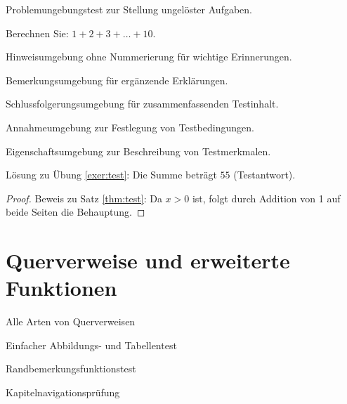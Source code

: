 \documentclass[de]{../../elegantbook}
\begin{document}
\begin{definition}[Testdefinition]
\begin{theorem}[Testsatz]
\begin{lemma}[Testlemma]
\begin{corollary}[Testkorollar]
\begin{axiom}[Testaxiom]
\begin{postulate}[Testpostulat]
\begin{proposition}[Testproposition]
\begin{problem}\label{probl:test}
Problemungebungstest zur Stellung ungelöster Aufgaben.
\end{problem}

\begin{exercise}\label{exer:test}
Berechnen Sie: $1+2+3+\dots+10$.
\end{exercise}

\begin{note}
Hinweisumgebung ohne Nummerierung für wichtige Erinnerungen.
\end{note}

\begin{remark}
Bemerkungsumgebung für ergänzende Erklärungen.
\end{remark}

\begin{conclusion}
Schlussfolgerungsumgebung für zusammenfassenden Testinhalt.
\end{conclusion}

\begin{assumption}
Annahmeumgebung zur Festlegung von Testbedingungen.
\end{assumption}

\begin{property}
Eigenschaftsumgebung zur Beschreibung von Testmerkmalen.
\end{property}

\begin{solution}
Lösung zu Übung \ref{exer:test}: Die Summe beträgt $55$ (Testantwort).
\end{solution}

\begin{proof}
Beweis zu Satz \ref{thm:test}: Da $x>0$ ist, folgt durch Addition von 1 auf beide Seiten die Behauptung.
\end{proof}

\chapter{Querverweise und erweiterte Funktionen}
\begin{introduction}
\item Alle Arten von Querverweisen
\item Einfacher Abbildungs- und Tabellentest
\item Randbemerkungsfunktionstest
\item Kapitelnavigationsprüfung
\end{introduction}


\end{proposition}
\end{postulate}
\end{axiom}
\end{corollary}
\end{lemma}
\end{theorem}
\end{definition}
\end{document}
